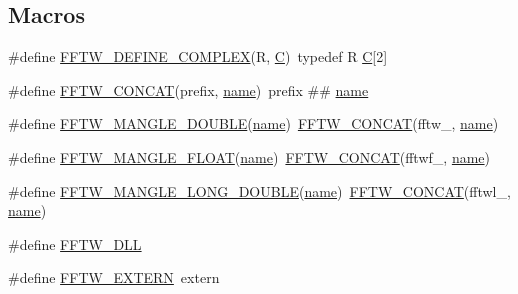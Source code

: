 \subsection*{Macros}
\begin{DoxyCompactItemize}
\item 
\#define \hyperlink{fftw-3_82_82-dll32_2fftw3_8h_ad8f7c74106f1f4e6e9e440939ed0c3e5}{F\-F\-T\-W\-\_\-\-D\-E\-F\-I\-N\-E\-\_\-\-C\-O\-M\-P\-L\-E\-X}(R, \hyperlink{fileio__fftw3_8cpp_ac4cf4b2ab929bd23951a8676eeac086b}{C})~typedef R \hyperlink{fileio__fftw3_8cpp_ac4cf4b2ab929bd23951a8676eeac086b}{C}\mbox{[}2\mbox{]}
\item 
\#define \hyperlink{fftw-3_82_82-dll32_2fftw3_8h_a8c2d0a5b182d76f85ba5d2ca10d0d14e}{F\-F\-T\-W\-\_\-\-C\-O\-N\-C\-A\-T}(prefix, \hyperlink{qmb_8m_abdc1dcc6fed70c14f9b5ae237e486f4e}{name})~prefix \#\# \hyperlink{qmb_8m_abdc1dcc6fed70c14f9b5ae237e486f4e}{name}
\item 
\#define \hyperlink{fftw-3_82_82-dll32_2fftw3_8h_a9a34b98e69e15389db5f159526aca09a}{F\-F\-T\-W\-\_\-\-M\-A\-N\-G\-L\-E\-\_\-\-D\-O\-U\-B\-L\-E}(\hyperlink{qmb_8m_abdc1dcc6fed70c14f9b5ae237e486f4e}{name})~\hyperlink{_g_u_i___matlab_2fftw3_8h_a8c2d0a5b182d76f85ba5d2ca10d0d14e}{F\-F\-T\-W\-\_\-\-C\-O\-N\-C\-A\-T}(fftw\-\_\-, \hyperlink{qmb_8m_abdc1dcc6fed70c14f9b5ae237e486f4e}{name})
\item 
\#define \hyperlink{fftw-3_82_82-dll32_2fftw3_8h_a0ff9d4e79eb81c3c32f9683c019841b7}{F\-F\-T\-W\-\_\-\-M\-A\-N\-G\-L\-E\-\_\-\-F\-L\-O\-A\-T}(\hyperlink{qmb_8m_abdc1dcc6fed70c14f9b5ae237e486f4e}{name})~\hyperlink{_g_u_i___matlab_2fftw3_8h_a8c2d0a5b182d76f85ba5d2ca10d0d14e}{F\-F\-T\-W\-\_\-\-C\-O\-N\-C\-A\-T}(fftwf\-\_\-, \hyperlink{qmb_8m_abdc1dcc6fed70c14f9b5ae237e486f4e}{name})
\item 
\#define \hyperlink{fftw-3_82_82-dll32_2fftw3_8h_a773f224bb53aff99ad9a07e10cdbf1c2}{F\-F\-T\-W\-\_\-\-M\-A\-N\-G\-L\-E\-\_\-\-L\-O\-N\-G\-\_\-\-D\-O\-U\-B\-L\-E}(\hyperlink{qmb_8m_abdc1dcc6fed70c14f9b5ae237e486f4e}{name})~\hyperlink{_g_u_i___matlab_2fftw3_8h_a8c2d0a5b182d76f85ba5d2ca10d0d14e}{F\-F\-T\-W\-\_\-\-C\-O\-N\-C\-A\-T}(fftwl\-\_\-, \hyperlink{qmb_8m_abdc1dcc6fed70c14f9b5ae237e486f4e}{name})
\item 
\#define \hyperlink{fftw-3_82_82-dll32_2fftw3_8h_a0e8309b7b6d200db75e0eb74cb0033e1}{F\-F\-T\-W\-\_\-\-D\-L\-L}
\item 
\#define \hyperlink{fftw-3_82_82-dll32_2fftw3_8h_a92cf927d928046b75d77824d34e9b084}{F\-F\-T\-W\-\_\-\-E\-X\-T\-E\-R\-N}~extern
\item 

\end{DoxyCompactItemize}
